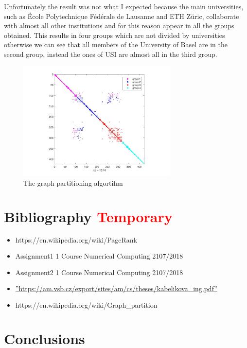 \documentclass[]{usiinfbachelorproject}
\begin{document}
Unfortunately the result was not what I expected because the main universities, such as \'{E}cole Polytechnique F\'{e}d\'{e}rale de Lausanne and  ETH Z\"{u}ric, collaborate with almost all other institutions and for this reason appear in all the groups obtained. This results in four groups which are not divided by universities otherwise we can see that all members of the University of Basel are in the second group, instead the ones of USI are almost all in the third group.
\begin{figure}[tb]
	\centering
	\includegraphics[height=6cm]{img/Analysis/graph_partitioning.jpg}
	\caption{The graph partitioning algortihm}
	\label{fig:graphPart}
\end{figure}


\newpage
\section{Bibliography  \textcolor{red}{Temporary}}
\begin{itemize}
\item https://en.wikipedia.org/wiki/PageRank
\item Assignment1 1 Course Numerical Computing 2107/2018
\item Assignment2 1 Course Numerical Computing 2107/2018
\item \hyperref[label_name]{''https://am.vsb.cz/export/sites/am/cs/theses/kabelikova\_ing.pdf''}
\item https://en.wikipedia.org/wiki/Graph\_partition
\end{itemize}







\section{Conclusions} \label{sec:conclusions}
\end{document}
